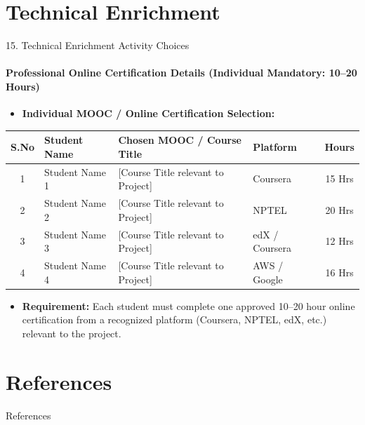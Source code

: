 \documentclass[aspectratio=169, 11pt]{beamer}
\begin{document}
\section{Technical Enrichment}
\begin{frame}{15. Technical Enrichment Activity Choices}
    \framesubtitle{Professional Online Certification Details (Individual Mandatory: 10--20 Hours)}
    \begin{itemize}
        \item \textbf{Individual MOOC / Online Certification Selection:}
    \end{itemize}
    \vspace{-0.1cm}
    \begin{table}
        \centering
        \footnotesize
        \renewcommand{\arraystretch}{1.15}
        \begin{tabular}{|c|p{2.8cm}|p{5.0cm}|p{2.3cm}|c|}
            \hline
            \textbf{S.No} & \textbf{Student Name} & \textbf{Chosen MOOC / Course Title} & \textbf{Platform} & \textbf{Hours} \\
            \hline
            1 & Student Name 1 & [Course Title relevant to Project] & Coursera & 15 Hrs \\
            \hline
            2 & Student Name 2 & [Course Title relevant to Project] & NPTEL & 20 Hrs \\
            \hline
            3 & Student Name 3 & [Course Title relevant to Project] & edX / Coursera & 12 Hrs \\
            \hline
            4 & Student Name 4 & [Course Title relevant to Project] & AWS / Google & 16 Hrs \\
            \hline
        \end{tabular}
    \end{table}
    \vspace{0.15cm}
    \begin{itemize}
        \item {\scriptsize \textbf{Requirement:} Each student must complete one approved 10--20 hour online certification from a recognized platform (Coursera, NPTEL, edX, etc.) relevant to the project.}
    \end{itemize}
\end{frame}

\section{References}
\begin{frame}[allowframebreaks]{References}
    
    
\end{frame}
\end{document}
